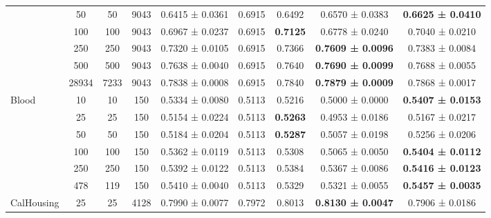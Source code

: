 \begin{table}
{\begin{tabular}[H]{@{}lcccccccc@{}}
                              & 50    & 50   & 9043 & 0.6415 ± 0.0361      & 0.6915               & 0.6492          & 0.6570 ± 0.0383          & \textbf{0.6625 ± 0.0410} \\
                              & 100   & 100  & 9043 & 0.6967 ± 0.0237      & 0.6915               & \textbf{0.7125} & 0.6778 ± 0.0240          & 0.7040 ± 0.0210          \\
                              & 250   & 250  & 9043 & 0.7320 ± 0.0105      & 0.6915               & 0.7366          & \textbf{0.7609 ± 0.0096} & 0.7383 ± 0.0084          \\
                              & 500   & 500  & 9043 & 0.7638 ± 0.0040      & 0.6915               & 0.7640          & \textbf{0.7690 ± 0.0099} & 0.7688 ± 0.0055          \\
                              & 28934 & 7233 & 9043 & 0.7838 ± 0.0008      & 0.6915               & 0.7840          & \textbf{0.7879 ± 0.0009} & 0.7868 ± 0.0017          \\
                              \midrule
\multirow{6}{*}{Blood}        & 10    & 10   & 150  & 0.5334 ± 0.0080      & 0.5113               & 0.5216          & 0.5000 ± 0.0000          & \textbf{0.5407 ± 0.0153} \\
                              & 25    & 25   & 150  & 0.5154 ± 0.0224      & 0.5113               & \textbf{0.5263} & 0.4953 ± 0.0186          & 0.5167 ± 0.0217          \\
                              & 50    & 50   & 150  & 0.5184 ± 0.0204      & 0.5113               & \textbf{0.5287} & 0.5057 ± 0.0198          & 0.5256 ± 0.0206          \\
                              & 100   & 100  & 150  & 0.5362 ± 0.0119      & 0.5113               & 0.5308          & 0.5065 ± 0.0050          & \textbf{0.5404 ± 0.0112} \\
                              & 250   & 250  & 150  & 0.5392 ± 0.0122      & 0.5113               & 0.5384          & 0.5367 ± 0.0086          & \textbf{0.5416 ± 0.0123} \\
                              & 478   & 119  & 150  & 0.5410 ± 0.0040      & 0.5113               & 0.5329          & 0.5321 ± 0.0055          & \textbf{0.5457 ± 0.0035} \\
                              \midrule
\multirow{6}{*}{CalHousing}   & 25    & 25   & 4128 & 0.7990 ± 0.0077      & 0.7972               & 0.8013          & \textbf{0.8130 ± 0.0047} & 0.7906 ± 0.0186          \\

\end{tabular}}
\end{table}
